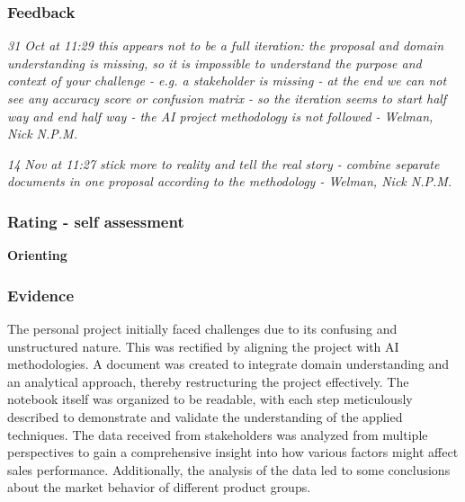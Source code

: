 \documentclass[a4paper, 11pt]{article}
\begin{document}
\subsubsection{Feedback}

\begin{mdframed}[backgroundcolor=gray!20, linecolor=black, linewidth=0pt, leftmargin=1cm, rightmargin=1cm, innertopmargin=10pt, innerbottommargin=10pt]
  \itshape
  31 Oct at 11:29 \smallbreak
this appears not to be a full iteration: the proposal and domain understanding is missing, so it is impossible to understand the purpose and context of your challenge - e.g. a stakeholder is missing - at the end we can not see any accuracy score or confusion matrix - so the iteration seems to start half way and end half way - the AI project methodology is not followed \smallbreak
- Welman, Nick N.P.M.
\end{mdframed}

\begin{mdframed}[backgroundcolor=gray!20, linecolor=black, linewidth=0pt, leftmargin=1cm, rightmargin=1cm, innertopmargin=10pt, innerbottommargin=10pt]
  \itshape
  14 Nov at 11:27 \smallbreak
  stick more to reality and tell the real story - combine separate documents in one proposal according to the methodology\smallbreak
- Welman, Nick N.P.M.
\end{mdframed}


\subsubsection{Rating - self assessment}
\textbf{Orienting} 
\subsubsection{Evidence}

The personal project initially faced challenges due to its confusing and unstructured nature. This was rectified by aligning the project with AI methodologies. A document was created to integrate domain understanding and an analytical approach, thereby restructuring the project effectively. The notebook itself was organized to be readable, with each step meticulously described to demonstrate and validate the understanding of the applied techniques. The data received from stakeholders was analyzed from multiple perspectives to gain a comprehensive insight into how various factors might affect sales performance. Additionally, the analysis of the data led to some conclusions about the market behavior of different product groups.
\end{document}
